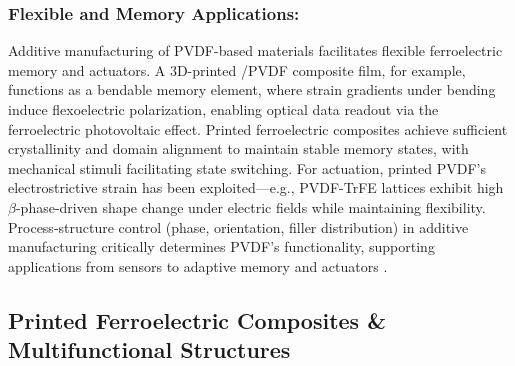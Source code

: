\documentclass[a4paper,fleqn]{cas-sc}
\begin{document}
\subsubsection*{Flexible and Memory Applications:}
\par Additive manufacturing of PVDF-based materials facilitates flexible ferroelectric memory and actuators. A 3D-printed /PVDF composite film, for example, functions as a bendable memory element, where strain gradients under bending induce flexoelectric polarization, enabling optical data readout via the ferroelectric photovoltaic effect. Printed ferroelectric composites achieve sufficient crystallinity and domain alignment to maintain stable memory states, with mechanical stimuli facilitating state switching. For actuation, printed PVDF’s electrostrictive strain has been exploited—e.g., PVDF-TrFE lattices exhibit high $\beta$-phase-driven shape change under electric fields while maintaining flexibility. Process-structure control (phase, orientation, filler distribution) in additive manufacturing critically determines PVDF’s functionality, supporting applications from sensors to adaptive memory and actuators \cite{Zhang2022Flexoelectricity}.

\subsection*{Printed Ferroelectric Composites \& Multifunctional Structures}
\end{document}

